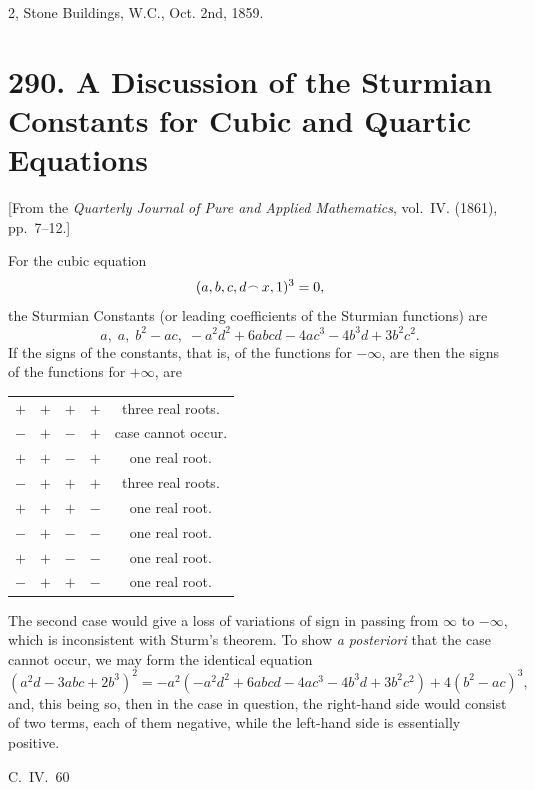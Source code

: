 \documentclass[11pt,a4paper]{article}
\theoremstyle{plain}
\begin{document}
\hfill 2, Stone Buildings, W.C., Oct. 2nd, 1859.



\newpage
\section*{290. A Discussion of the Sturmian Constants for Cubic and Quartic Equations}
\label{sec:290}

[From the \textit{Quarterly Journal of Pure and Applied Mathematics}, vol.~IV. (1861), pp.~7--12.]

For the cubic equation
\[
(a, b, c, d \mathbin{\vcenter{\hbox{$\scriptstyle\!\frown$}}} x, 1)^3 = 0,
\]
the Sturmian Constants (or leading coefficients of the Sturmian functions) are
\[
a,\; a,\; b^2 - ac,\; -a^2d^2 + 6abcd - 4ac^3 - 4b^3d + 3b^2c^2.
\]
If the signs of the constants, that is, of the functions for $-\infty$, are then the signs of the functions for $+\infty$, are
\begin{center}
\begin{tabular}{cccc|c}
$+$ & $+$ & $+$ & $+$ & three real roots.\\
$-$ & $+$ & $-$ & $+$ & case cannot occur.\\
$+$ & $+$ & $-$ & $+$ & one real root.\\
$-$ & $+$ & $+$ & $+$ & three real roots.\\
$+$ & $+$ & $+$ & $-$ & one real root.\\
$-$ & $+$ & $-$ & $-$ & one real root.\\
$+$ & $+$ & $-$ & $-$ & one real root.\\
$-$ & $+$ & $+$ & $-$ & one real root.
\end{tabular}
\end{center}

The second case would give a loss of variations of sign in passing from $\infty$ to $-\infty$, which is inconsistent with Sturm's theorem. To show \textit{a posteriori} that the case cannot occur, we may form the identical equation
\[
(a^2d - 3abc + 2b^3)^2 = -a^2(-a^2d^2 + 6abcd - 4ac^3 - 4b^3d + 3b^2c^2) + 4(b^2 - ac)^3,
\]
and, this being so, then in the case in question, the right-hand side would consist of two terms, each of them negative, while the left-hand side is essentially positive.

\hfill C.~IV.\ 60
\end{document}
